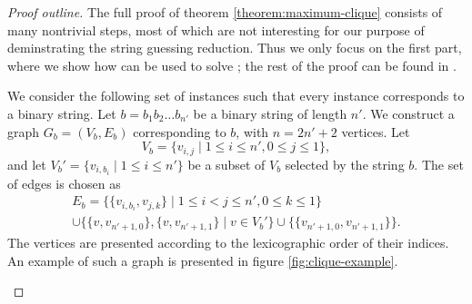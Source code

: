 \begin{proof}[Proof outline]
    The full proof of theorem \ref{theorem:maximum-clique} consists of many
    nontrivial steps, most of which are not interesting for our purpose of
    deminstrating the string guessing reduction. Thus we only focus on the
    first part, where we show how  can be used to solve
    ; the rest of the proof can be found in
    \cite{string-guessing}.

    We consider the following set of instances such that every instance
    corresponds to a binary string. Let $b = b_1b_2\dots{}b_{n'}$ be a
    binary string of length $n'$. We construct a graph $G_b = (V_b, E_b)$
    corresponding to $b$, with $n = 2n' + 2$ vertices. Let
    $$
        V_b = \{v_{i,j} \mid 1 \leq i \leq n', 0 \leq j \leq 1 \},
    $$
    and let $V_b' = \{v_{i,b_i} \mid 1 \leq i \leq n'\}$ be a subset of
    $V_b$ selected by the string $b$. The set of edges is chosen as
    \begin{multline*}
        E_b = \{\{v_{i,b_i}, v_{j,k}\} \mid 1 \leq i < j \leq n', 0 \leq k
                \leq 1\} \\
        \cup \{\{v, v_{n'+1,0}\}, \{v, v_{n'+1,1}\} \mid v \in V_b'\}
        \cup \{\{v_{n'+1,0}, v_{n'+1,1}\}\}.
    \end{multline*}
    The vertices are presented according to the lexicographic order of
    their indices. An example of such a graph is presented in figure
    \ref{fig:clique-example}.

    \begin{figure}\centering
\end{figure}
\end{proof}
